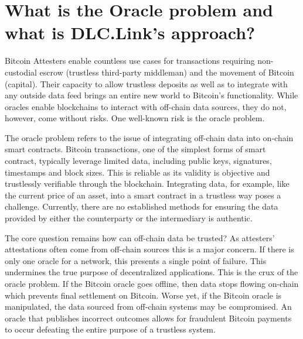 \documentclass[twoside, a4paper, 11pt]{article}
\begin{document}
  \section{What is the Oracle problem and what is DLC.Link’s approach?}

  Bitcoin Attesters enable countless use cases for transactions requiring non-custodial escrow (trustless third-party middleman) and the movement of Bitcoin (capital). Their capacity to allow trustless deposits as well as to integrate with any outside data feed brings an entire new world to Bitcoin’s functionality. While oracles enable blockchains to interact with off-chain data sources, they do not, however, come without risks. One well-known risk is the oracle problem.

  The oracle problem refers to the issue of integrating off-chain data into on-chain smart contracts. Bitcoin transactions, one of the simplest forms of smart contract, typically leverage limited data, including public keys, signatures, timestamps and block sizes. This is reliable as its validity is objective and trustlessly verifiable through the blockchain. Integrating data, for example, like the current price of an asset, into a smart contract in a trustless way poses a challenge. Currently, there are no established methods for ensuring the data provided by either the counterparty or the intermediary is authentic.

  The core question remains how can off-chain data be trusted? As attesters' attestations often come from off-chain sources this is a major concern. If there is only one oracle for a network, this presents a single point of failure. This undermines the true purpose of decentralized applications. This is the crux of the oracle problem. If the Bitcoin oracle goes offline, then data stops flowing on-chain which prevents final settlement on Bitcoin. Worse yet, if the Bitcoin oracle is manipulated, the data sourced from off-chain systems may be compromised. An oracle that publishes incorrect outcomes allows for fraudulent Bitcoin payments to occur defeating the entire purpose of a trustless system.
\end{document}
